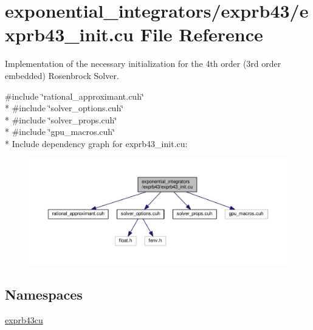 \hypertarget{exprb43__init_8cu}{}\section{exponential\+\_\+integrators/exprb43/exprb43\+\_\+init.cu File Reference}
\label{exprb43__init_8cu}


Implementation of the necessary initialization for the 4th order (3rd order embedded) Rosenbrock Solver.  


{\ttfamily \#include \char`\"{}rational\+\_\+approximant.\+cuh\char`\"{}}\\*
{\ttfamily \#include \char`\"{}solver\+\_\+options.\+cuh\char`\"{}}\\*
{\ttfamily \#include \char`\"{}solver\+\_\+props.\+cuh\char`\"{}}\\*
{\ttfamily \#include \char`\"{}gpu\+\_\+macros.\+cuh\char`\"{}}\\*
Include dependency graph for exprb43\+\_\+init.\+cu\+:\nopagebreak
\begin{figure}[H]
\begin{center}
\leavevmode
\includegraphics[width=350pt]{exprb43__init_8cu__incl}
\end{center}
\end{figure}
\subsection*{Namespaces}
\begin{DoxyCompactItemize}
\item 
 \hyperlink{namespaceexprb43cu}{exprb43cu}
\end{DoxyCompactItemize}
